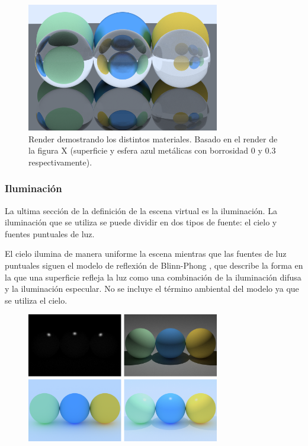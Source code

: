 \documentclass[10pt, a4paper]{article}
\begin{document}
\begin{figure}[h]
     \centering 
    \includegraphics[width=0.75\textwidth]{01_materials}

    \caption{Render demostrando los distintos materiales. Basado en el render de la figura X (superficie y esfera azul metálicas con borrosidad 0 y 0.3 respectivamente).}
\end{figure}

\subsubsection{Iluminación}

La ultima sección de la definición de la escena virtual es la iluminación. La iluminación que se utiliza se puede dividir en dos tipos de fuente: el cielo y fuentes puntuales de luz.

El cielo ilumina de manera uniforme la escena mientras que las fuentes de luz puntuales siguen el modelo de reflexión de Blinn-Phong \cite{Blinn:1977}, que describe la forma en la que una superficie refleja la luz como una combinación de la iluminación difusa y la iluminación especular. No se incluye el término ambiental del modelo ya que se utiliza el cielo.


\begin{figure}[h]
     \centering 
    \includegraphics[width=0.75\textwidth]{05_agg}

\end{figure}
\end{document}

